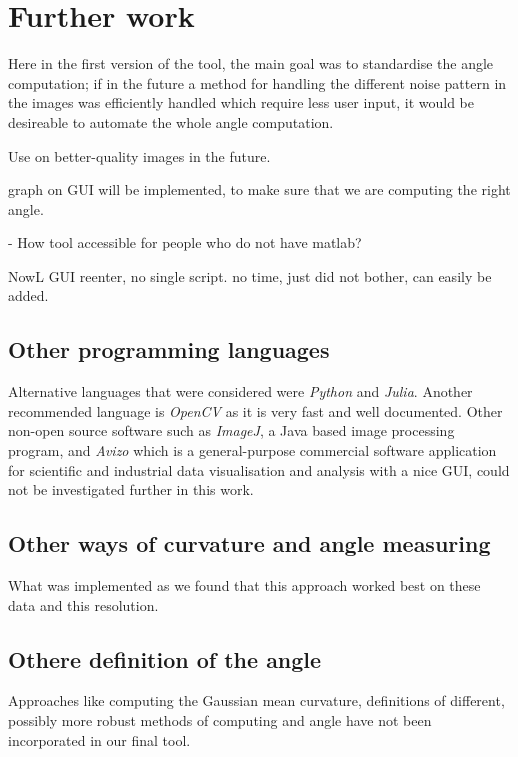 \section{Further work}

Here in the first version of the tool, the main goal was to standardise the angle computation; if in the future  a method for handling the different noise pattern in the images was efficiently handled which require less user input, it would be desireable to automate the whole angle computation.

Use on better-quality images in the future.


graph on GUI will be implemented, to make sure that we are computing the right angle.


- How tool accessible for people who do not have matlab?

NowL GUI reenter, no single script. no time, just did not bother, can easily be added.



\subsection{Other programming languages}

Alternative languages that were considered were \textit{Python} and \textit{Julia}. Another recommended language is \textit{OpenCV} as it is very fast and well documented. Other non-open source software such as \textit{ImageJ}, a Java based image processing program, and \textit{Avizo} which is a general-purpose commercial software application for scientific and industrial data visualisation and analysis with a nice GUI, could not be investigated further in this work. 


\subsection{Other ways of curvature and angle measuring}

What was implemented as we found that this approach worked best on these data and this resolution.

\subsection{Othere definition of the angle}
Approaches like computing the Gaussian mean curvature, definitions of different, possibly more robust methods of computing and angle %
have not been incorporated in our final tool. 


